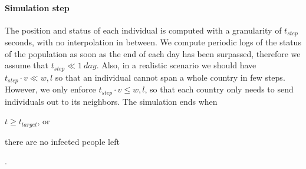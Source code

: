 \paragraph{Simulation step}
The position and status of each individual is computed with a granularity of $t_{step}$ seconds, with no interpolation in between.
We compute periodic logs of the status of the population as soon as the end of each day has been surpassed, therefore we assume that $t_{step} \ll \SI{1}{day}$. Also, in a realistic scenario we should have $t_{step} \cdot v \ll w,l$ so that an individual cannot span a whole country in few steps. However, we only enforce $t_{step} \cdot v \le w,l$, so that each country only needs to send individuals out to its neighbors.
The simulation ends when
\begin{enumerate*}[label=(\roman*)]
    \item $t \geq t_{target}$, or
    \item there are no infected people left
\end{enumerate*}.